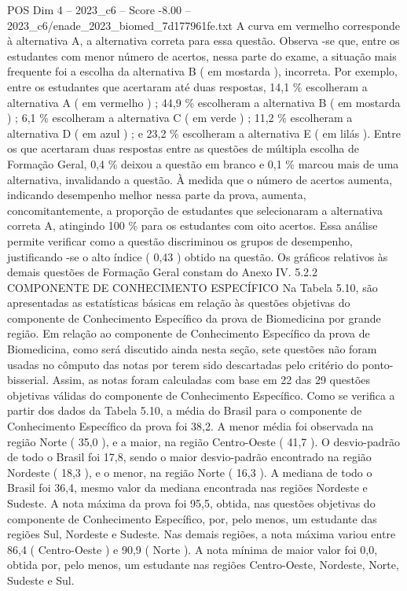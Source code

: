 \begin{textsample}{POS Dim 4 – 2023\_c6 – Score -8.00 – 2023\_c6/enade\_2023\_biomed\_7d177961fe.txt}
A curva em vermelho corresponde à alternativa A, a alternativa correta para essa questão.
Observa -se que, entre os estudantes com menor número de acertos, nessa parte do exame, a situação mais frequente foi a escolha da alternativa B ( em mostarda ), incorreta.
Por exemplo, entre os estudantes que acertaram até duas respostas, 14,1 \% escolheram a alternativa A ( em vermelho ) ; 44,9 \% escolheram a alternativa B ( em mostarda ) ; 6,1 \% escolheram a alternativa C ( em verde ) ; 11,2 \% escolheram a alternativa D ( em azul ) ; e 23,2 \% escolheram a alternativa E ( em lilás ).
Entre os que acertaram duas respostas entre as questões de múltipla escolha de Formação Geral, 0,4 \% deixou a questão em branco e 0,1 \% marcou mais de uma alternativa, invalidando a questão.
À medida que o número de acertos aumenta, indicando desempenho melhor nessa parte da prova, aumenta, concomitantemente, a proporção de estudantes que selecionaram a alternativa correta A, atingindo 100 \% para os estudantes com oito acertos.
Essa análise permite verificar como a questão discriminou os grupos de desempenho, justificando -se o alto índice ( 0,43 ) obtido na questão.
Os gráficos relativos às demais questões de Formação Geral constam do Anexo IV. 5.2.2 COMPONENTE DE CONHECIMENTO ESPECÍFICO Na Tabela 5.10, são apresentadas as estatísticas básicas em relação às questões objetivas do componente de Conhecimento Específico da prova de Biomedicina por grande região.
Em relação ao componente de Conhecimento Específico da prova de Biomedicina, como será discutido ainda nesta seção, sete questões não foram usadas no cômputo das notas por terem sido descartadas pelo critério do ponto-bisserial.
Assim, as notas foram calculadas com base em 22 das 29 questões objetivas válidas do componente de Conhecimento Específico.
Como se verifica a partir dos dados da Tabela 5.10, a média do Brasil para o componente de Conhecimento Específico da prova foi 38,2.
A menor média foi observada na região Norte ( 35,0 ), e a maior, na região Centro-Oeste ( 41,7 ).
O desvio-padrão de todo o Brasil foi 17,8, sendo o maior desvio-padrão encontrado na região Nordeste ( 18,3 ), e o menor, na região Norte ( 16,3 ).
A mediana de todo o Brasil foi 36,4, mesmo valor da mediana encontrada nas regiões Nordeste e Sudeste.
A nota máxima da prova foi 95,5, obtida, nas questões objetivas do componente de Conhecimento Específico, por, pelo menos, um estudante das regiões Sul, Nordeste e Sudeste.
Nas demais regiões, a nota máxima variou entre 86,4 ( Centro-Oeste ) e 90,9 ( Norte ).
A nota mínima de maior valor foi 0,0, obtida por, pelo menos, um estudante nas regiões Centro-Oeste, Nordeste, Norte, Sudeste e Sul.

\end{textsample}
